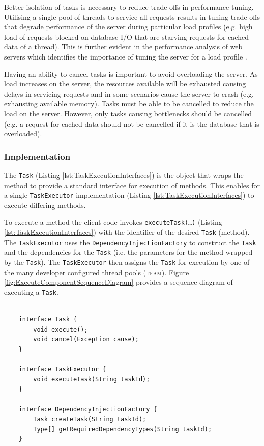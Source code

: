 \documentclass[prodmode]{style/acmlarge}
\begin{document}
Better isolation of tasks is necessary to reduce trade-offs in performance
tuning.  Utilising a single pool of threads to service all requests results in
tuning trade-offs that degrade performance of the server during particular load
profiles (e.g. high load of requests blocked on database I/O that are starving
requests for cached data of a thread).  This is further evident in the
performance analysis of web servers which identifies the importance of tuning
the server for a load profile
\cite{tuning-important,low-server-footprint,tuning-os-important}.

Having an ability to cancel tasks is important to avoid overloading the server. 
As load increases on the server, the resources available will be exhausted
causing delays in servicing requests and in some scenarios cause the server to
crash (e.g. exhausting available memory).  Tasks must be able to be cancelled to
reduce the load on the server.  However, only tasks causing bottlenecks should
be cancelled (e.g. a request for cached data should not be cancelled if it is
the database that is overloaded).


\subsubsection*{Implementation}

The \texttt{Task} (Listing \ref{lst:TaskExecutionInterfaces}) is the object that wraps
the method to provide a standard interface for execution of methods.  This
enables for a single \texttt{TaskExecutor} implementation (Listing
\ref{lst:TaskExecutionInterfaces}) to execute differing methods.

To execute a method the client code invokes \texttt{executeTask(\ldots)}
(Listing \ref{lst:TaskExecutionInterfaces}) with the identifier of the desired
\texttt{Task} (method).  The \texttt{TaskExecutor} uses the
\texttt{DependencyInjectionFactory} to construct the \texttt{Task}
and the dependencies for the \texttt{Task} (i.e. the parameters for the method
wrapped by the \texttt{Task}).  The \texttt{TaskExecutor} then assigns the
\texttt{Task} for execution by one of the many developer configured thread pools
(\textsc{team}).  Figure \ref{fig:ExecuteComponentSequenceDiagram} provides a
sequence diagram of executing a \texttt{Task}.

\begin{lstlisting}[float,label=lst:TaskExecutionInterfaces]

    interface Task {
        void execute(); 
        void cancel(Exception cause);
    }

    interface TaskExecutor {
        void executeTask(String taskId);
    }

    interface DependencyInjectionFactory {
        Task createTask(String taskId);
        Type[] getRequiredDependencyTypes(String taskId);
    }
\end{lstlisting}
\end{document}
